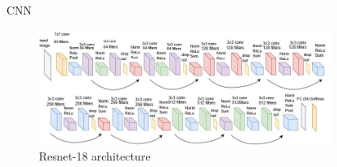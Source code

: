 \documentclass{beamer}
\begin{document}
    \begin{frame}{CNN} 
    
    \begin{figure}[ht]
        \centering
        \includegraphics[width=0.85\textwidth]{resnet18.jpeg}
        \caption{Resnet-18 architecture}
        \label{Resnet18}
    \end{figure}

    \end{frame}
\end{document}
